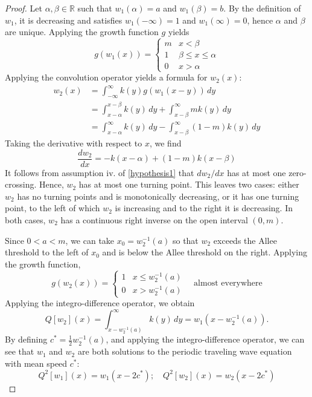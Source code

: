 \documentclass[11pt]{article}
\theoremstyle{definition}
\numberwithin{equation}{section}
\numberwithin{thm}{section}
\begin{document}
\begin{proof} Let $\alpha,\beta\in\mathbb R$ such that $w_1(\alpha)=a$ and $w_1(\beta)=b$.  By the definition of $w_1$, it is decreasing and satisfies $w_1(-\infty)=1$ and $w_1(\infty)=0$, hence $\alpha$ and $\beta$ are unique.  Applying the growth function $g$ yields
\begin{equation} \label{gw1}
g(w_1(x)) = \begin{cases}
m & x < \beta \\
1 & \beta \leq x \leq \alpha \\
0 & x > \alpha
\end{cases} \end{equation}
Applying the convolution operator yields a formula for $w_2(x)$:
\begin{equation} \label{w2}
\begin{aligned}
w_2(x) &= \int_{-\infty}^{\infty} k(y) g(w_1(x-y)) \, dy \\
&= \int_{x-\alpha}^{x-\beta} k(y)\,dy + \int_{x-\beta}^{\infty} m k(y)\,dy \\
&= \int_{x-\alpha}^{\infty} k(y)\,dy - \int_{x-\beta}^{\infty} (1-m) k(y)\,dy
\end{aligned}
\end{equation}
Taking the derivative with respect to $x$, we find
\begin{equation}
\frac{dw_2}{dx} = -k(x-\alpha) + (1-m)k(x-\beta)
\end{equation}
It follows from assumption iv. of \ref{hypothesis1} that $dw_2/dx$ has at most one zero-crossing. Hence, $w_2$ has at most one turning point. This leaves two cases: either $w_2$ has no turning points and is monotonically decreasing, or it has one turning point, to the left of which $w_2$ is increasing and to the right it is decreasing. In both cases, $w_2$ has a continuous right inverse on the open interval $(0,m)$.

Since $0<a<m$, we can take $x_0=w_2^{-1}(a)$  so that $w_2$ exceeds the Allee threshold to the left of $x_0$ and is below the Allee threshold on the right. Applying the growth function,
\begin{equation} \label{gw2}
g(w_2(x)) = \begin{cases}
1 & x \leq w_2^{-1}(a) \\
0 & x > w_2^{-1}(a)
\end{cases} \quad \text{almost everywhere}
\end{equation}
Applying the integro-difference operator, we obtain
\begin{equation}
Q[w_2](x) = \int_{x-w_2^{-1}(a)}^{\infty} k(y)\,dy = w_1(x-w_2^{-1}(a)).
\end{equation}
By defining $c^* = \frac{1}{2}w_2^{-1}(a)$, and applying the integro-difference operator, we can see that $w_1$ and $w_2$ are both solutions to the periodic traveling wave equation with mean speed $c^*$:
\begin{equation}
Q^2[w_1](x) = w_1(x-2c^*); \quad Q^2[w_2](x) = w_2(x-2c^*)
\end{equation}
\end{proof}
\end{document}
